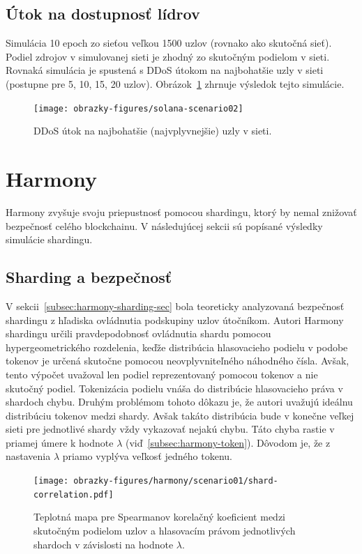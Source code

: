 \subsection{Útok na dostupnosť lídrov}
Simulácia 10 epoch zo sieťou veľkou 1500 uzlov (rovnako ako skutočná sieť). Podiel zdrojov v simulovanej sieti je zhodný zo skutočným podielom v sieti. Rovnaká simulácia je spustená s DDoS útokom na najbohatšie uzly v sieti (postupne pre 5, 10, 15, 20 uzlov). Obrázok~\ref{img:solana-scenario02} zhrnuje výsledok tejto simulácie.
\begin{figure}[H]
	\centering
	\texttt{[image: obrazky-figures/solana-scenario02]}
	\caption{DDoS útok na najbohatšie (najvplyvnejšie) uzly v sieti.}
	\label{img:solana-scenario02}
\end{figure}

\section{Harmony}

Harmony zvyšuje svoju priepustnosť pomocou shardingu, ktorý by nemal znižovať bezpečnosť celého blockchainu. V následujúcej sekcii sú popísané výsledky simulácie shardingu.

\subsection{Sharding a bezpečnosť}\label{subsec:harmony-sec-exp}

V sekcii~\ref{subsec:harmony-sharding-sec} bola teoreticky analyzovaná bezpečnosť shardingu z hľadiska ovládnutia podskupiny uzlov útočníkom. Autori Harmony shardingu určili pravdepodobnosť ovládnutia shardu pomocou hypergeometrického rozdelenia, keďže distribúcia hlasovacieho podielu v podobe tokenov je určená skutočne pomocou neovplyvniteľného náhodného čísla. Avšak, tento výpočet uvažoval len podiel reprezentovaný pomocou tokenov a nie skutočný podiel. Tokenizácia podielu vnáša do distribúcie hlasovacieho práva v shardoch chybu. Druhým problémom tohoto dôkazu je, že autori uvažujú ideálnu distribúciu tokenov medzi shardy. Avšak takáto distribúcia bude v konečne veľkej sieti pre jednotlivé shardy vždy vykazovať nejakú chybu. Táto chyba rastie v priamej úmere k hodnote $\lambda$ (viď~\ref{subsec:harmony-token}). Dôvodom je, že z nastavenia $\lambda$ priamo vyplýva veľkosť jedného tokenu.

\begin{figure}[H]
	\centering
	\texttt{[image: obrazky-figures/harmony/scenario01/shard-correlation.pdf]}
	\caption{Teplotná mapa pre Spearmanov korelačný koeficient medzi skutočným podielom uzlov a hlasovacím právom jednotlivých shardoch v závislosti na hodnote $\lambda$.}
	\label{img:harmony-shard-correlation}
\end{figure}

